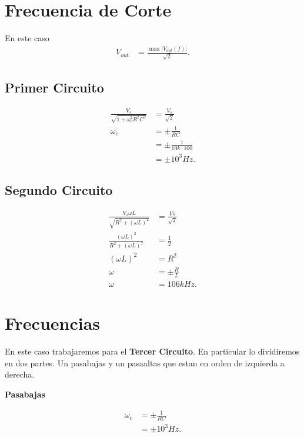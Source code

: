 \documentclass[12pt]{article}
\begin{document}
\section*{Frecuencia de Corte}

En este caso
\begin{align*}
  V_{out} &= \frac{\max\left| V_{out}\left( f \right)  \right| }{\sqrt{2} }
.\end{align*}

\subsection*{Primer Circuito}

\begin{align*}
  \frac{V_s}{\sqrt{1 + \omega_c^2R^2C^2} } &= \frac{V_s}{\sqrt{2} } \\
  \omega_c &= \pm \frac{1}{RC} \\
  &= \pm \frac{1}{10k\cdot 100} \\
  &= \pm 10^{3} Hz
.\end{align*}

\subsection*{Segundo Circuito}

\begin{align*}
  \frac{V_s \omega L}{\sqrt{R^2 + \left( \omega L \right)^2} }&= \frac{Vs}{\sqrt{2} } \\
  \frac{\left( \omega L \right)^2}{R^2 + \left( \omega L \right)^2}&= \frac{1}{2} \\
  \left( \omega L \right)^2 &= R^2 \\
  \omega &= \pm \frac{R}{L} \\
  \omega &= 106 kHz 
.\end{align*}

\section*{Frecuencias}

En este caso trabajaremos para el \textbf{Tercer Circuito}. En particular lo dividiremos en dos partes. Un pasabajas y un pasaaltas que estan en orden de izquierda a derecha.

\textbf{Pasabajas}

\begin{align*}
  \omega_c &= \pm\frac{1}{RC} \\
  &= \pm 10^{3}Hz
.\end{align*}
\end{document}
